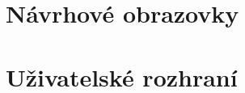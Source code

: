 \chapter{Návrhové obrazovky}\label{appendix:navrhoveObrazovky}


\chapter{Uživatelské rozhraní}\label{appendix:uzivatelskeRozhrani}